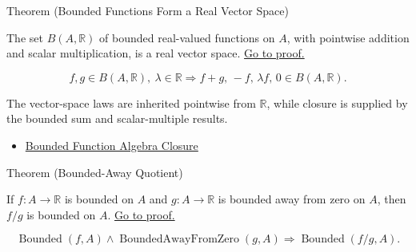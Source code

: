 \begin{theorembox}{Theorem (Bounded Functions Form a Real Vector Space)}
\begin{theorem}
\label{thm:bounded-functions-form-real-vector-space}
The set \(B(A,\mathbb{R})\) of bounded real-valued functions on \(A\), with
pointwise addition and scalar multiplication, is a real vector space.
\hyperref[prf:bounded-functions-form-real-vector-space]{Go to proof.}
\end{theorem}
\end{theorembox}

\begin{remark*}
\[
  f,g\in B(A,\mathbb{R}),\ \lambda\in\mathbb{R}
  \Rightarrow
  f+g,\, -f,\, \lambda f,\, 0 \in B(A,\mathbb{R}).
\]
\end{remark*}

\begin{remark*}[Interpretation]
The vector-space laws are inherited pointwise from \(\mathbb{R}\), while
closure is supplied by the bounded sum and scalar-multiple results.
\end{remark*}

\begin{dependencies}
\begin{itemize}
  \item \hyperref[thm:bounded-function-algebra-closure]{Bounded Function Algebra Closure}
\end{itemize}
\end{dependencies}

\begin{theorembox}{Theorem (Bounded-Away Quotient)}
\begin{theorem}
\label{thm:bounded-away-quotient}
If \(f:A\to\mathbb{R}\) is bounded on \(A\) and \(g:A\to\mathbb{R}\) is
bounded away from zero on \(A\), then \(f/g\) is bounded on \(A\).
\hyperref[prf:bounded-away-quotient]{Go to proof.}
\end{theorem}
\end{theorembox}

\begin{remark*}
\[
  \operatorname{Bounded}(f,A)\wedge\operatorname{BoundedAwayFromZero}(g,A)
  \Rightarrow \operatorname{Bounded}(f/g,A).
\]
\end{remark*}

